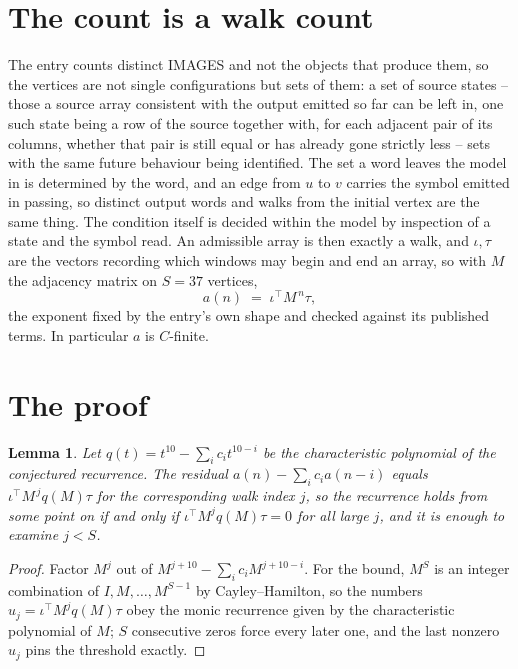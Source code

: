 \documentclass[11pt,a4paper]{article}
\theoremstyle{plain}
\newtheorem{lemma}[theorem]{Lemma}
\theoremstyle{definition}
\begin{document}
\section{The count is a walk count}

The entry counts distinct IMAGES and not the objects that produce them, so the vertices are not single configurations but sets of them: a set of source states -- those a source array consistent with the output emitted so far can be left in, one such state being a row of the source together with, for each adjacent pair of its columns, whether that pair is still equal or has already gone strictly less -- sets with the same future behaviour being identified. The set a word leaves the model in is determined by the word, and an edge from $u$ to $v$ carries the symbol emitted in passing, so distinct output words and walks from the initial vertex are the same thing. The condition itself is decided within the model by inspection of a state and the symbol read.
An admissible array is then exactly a walk, and $\iota,\tau$ are the vectors recording which windows may begin and end an array, so with $M$ the adjacency matrix on $S=37$ vertices,
\[
a(n)\;=\;\iota^{\!\top}M^{\,n}\tau ,
\]
the exponent fixed by the entry's own shape and checked against its published terms. In
particular $a$ is $C$-finite.

\section{The proof}

\begin{lemma}\label{lem:crit}
Let $q(t)=t^{10}-\sum_i c_it^{10-i}$ be the characteristic polynomial of the
conjectured recurrence. The residual $a(n)-\sum_ic_ia(n-i)$ equals
$\iota^{\!\top}M^{\,j}q(M)\tau$ for the corresponding walk index $j$, so the recurrence
holds from some point on if and only if $\iota^{\!\top}M^{j}q(M)\tau=0$ for all large $j$,
and it is enough to examine $j<S$.
\end{lemma}

\begin{proof}
Factor $M^{j}$ out of $M^{j+10}-\sum_ic_iM^{j+10-i}$. For the bound, $M^{S}$
is an integer combination of $I,M,\dots,M^{S-1}$ by Cayley--Hamilton, so the numbers
$u_j=\iota^{\!\top}M^{j}q(M)\tau$ obey the monic recurrence given by the characteristic
polynomial of $M$; $S$ consecutive zeros force every later one, and the last nonzero $u_j$
pins the threshold exactly.
\end{proof}
\end{document}
